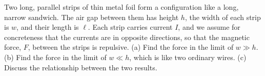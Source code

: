Two long, parallel strips of thin metal foil form a configuration like a long,
        narrow sandwich. The air gap between them has height $h$, the width of each
        strip is $w$, and their length is $\ell$. 
        Each strip carries current $I$, and we assume for concreteness that
        the currents are in opposite directions, so that the magnetic force, $F$, between
        the strips is repulsive.\hwendpart
        (a) Find the force in the limit of $w\gg h$.\answercheck\hwendpart
        (b) Find the force in the limit of $w\ll h$, which is like two ordinary wires.\hwendpart
        (c) Discuss the relationship between the two results.
